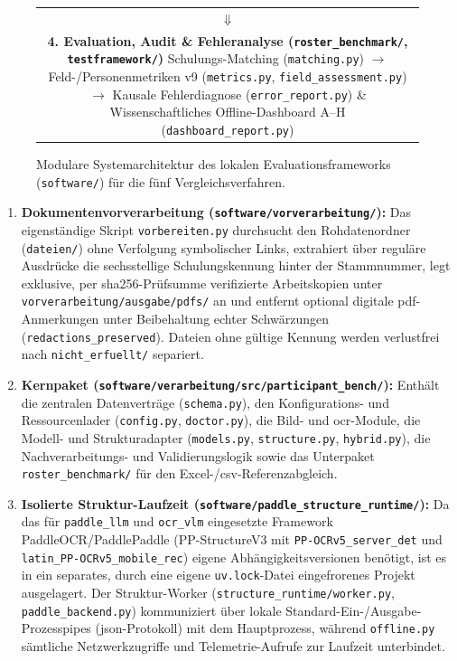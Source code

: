\begin{figure}[htbp]
\begin{tabular}{@{}c@{}}
    $\Downarrow$ \\[4pt]
    \fbox{\parbox{0.92\textwidth}{\centering
      \textbf{4. Evaluation, Audit \& Fehleranalyse (\texttt{roster\_benchmark/}, \texttt{testframework/})}\\[2pt]
      Schulungs-Matching (\texttt{matching.py}) $\rightarrow$ Feld-/Personenmetriken v9 (\texttt{metrics.py}, \texttt{field\_assessment.py}) $\rightarrow$ Kausale Fehlerdiagnose (\texttt{error\_report.py}) \& Wissenschaftliches Offline-Dashboard A--H (\texttt{dashboard\_report.py})
    }}
  \end{tabular}
  \caption{Modulare Systemarchitektur des lokalen Evaluationsframeworks (\texttt{software/}) für die fünf Vergleichsverfahren.}
  \label{fig:systemarchitektur}
\end{figure}

\begin{enumerate}
  \item \textbf{Dokumentenvorverarbeitung (\texttt{software/vorverarbeitung/}):} Das eigenständige Skript \texttt{vorbereiten.py} durchsucht den Rohdatenordner (\texttt{dateien/}) ohne Verfolgung symbolischer Links, extrahiert über reguläre Ausdrücke die sechsstellige Schulungskennung hinter der Stammnummer, legt exklusive, per \ac{sha256}-Prüfsumme verifizierte Arbeitskopien unter \texttt{vorverarbeitung/ausgabe/pdfs/} an und entfernt optional digitale \ac{pdf}-Anmerkungen unter Beibehaltung echter Schwärzungen (\texttt{redactions\_preserved}). Dateien ohne gültige Kennung werden verlustfrei nach \texttt{nicht\_erfuellt/} separiert.
  \item \textbf{Kernpaket (\texttt{software/verarbeitung/src/participant\_bench/}):} Enthält die zentralen Datenverträge (\texttt{schema.py}), den Konfigurations- und Ressourcenlader (\texttt{config.py}, \texttt{doctor.py}), die Bild- und \ac{ocr}-Module, die Modell- und Strukturadapter (\texttt{models.py}, \texttt{structure.py}, \texttt{hybrid.py}), die Nachverarbeitungs- und Validierungslogik sowie das Unterpaket \texttt{roster\_benchmark/} für den Excel-/\ac{csv}-Referenzabgleich.
  \item \textbf{Isolierte Struktur-Laufzeit (\texttt{software/paddle\_structure\_runtime/}):} Da das für \texttt{paddle\_llm} und \texttt{ocr\_vlm} eingesetzte Framework PaddleOCR/PaddlePaddle (PP-StructureV3 mit \texttt{PP-OCRv5\_server\_det} und \texttt{latin\_PP-OCRv5\_mobile\_rec}) eigene Abhängigkeitsversionen benötigt, ist es in ein separates, durch eine eigene \texttt{uv.lock}-Datei eingefrorenes Projekt ausgelagert. Der Struktur-Worker (\texttt{structure\_runtime/worker.py}, \texttt{paddle\_backend.py}) kommuniziert über lokale Standard-Ein-/Ausgabe-Prozesspipes (\ac{json}-Protokoll) mit dem Hauptprozess, während \texttt{offline.py} sämtliche Netzwerkzugriffe und Telemetrie-Aufrufe zur Laufzeit unterbindet.

\end{enumerate}
